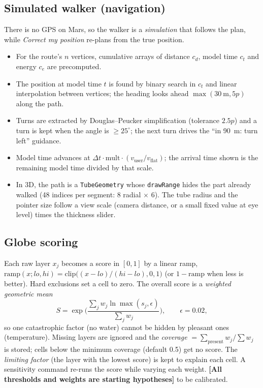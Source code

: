 \documentclass[11pt,a4paper]{article}
\newcommand{\hyp}[1]{\textcolor{marsred}{\textbf{[#1]}}}   %
\renewcommand{\_}{\textunderscore\allowbreak}
\newcommand{\code}[1]{\texttt{#1}}
\begin{document}
\subsection{Simulated walker (navigation)}
There is no GPS on Mars, so the walker is a \emph{simulation} that follows the plan, while \emph{Correct my position} re-plans from the true position.
\begin{itemize}
\item For the route's $n$ vertices, cumulative arrays of distance $c_d$, model time $c_t$ and energy $c_e$ are precomputed.
\item The position at model time $t$ is found by binary search in $c_t$ and linear interpolation between vertices; the heading looks ahead $\max(30\ \text{m},5p)$ along the path.
\item Turns are extracted by Douglas--Peucker simplification (tolerance $2.5p$) and a turn is kept when the angle is $\ge25^\circ$; the next turn drives the ``in 90~m: turn left'' guidance.
\item Model time advances at $\Delta t\cdot\text{mult}\cdot(v_\text{user}/v_\text{flat})$; the arrival time shown is the remaining model time divided by that scale.
\item In 3D, the path is a \code{TubeGeometry} whose \code{drawRange} hides the part already walked (48 indices per segment: 8 radial $\times$ 6). The tube radius and the pointer size follow a view scale (camera distance, or a small fixed value at eye level) times the thickness slider.
\end{itemize}

\subsection{Globe scoring}
Each raw layer $x_j$ becomes a score in $[0,1]$ by a linear ramp, $\text{ramp}(x;lo,hi)=\text{clip}\big((x-lo)/(hi-lo),0,1\big)$ (or $1-\text{ramp}$ when less is better). Hard exclusions set a cell to zero. The overall score is a \emph{weighted geometric mean}
\[
S=\exp\!\Big(\frac{\sum_j w_j\ln\max(s_j,\epsilon)}{\sum_j w_j}\Big),\qquad \epsilon=0.02,
\]
so one catastrophic factor (no water) cannot be hidden by pleasant ones (temperature). Missing layers are ignored and the \emph{coverage} $=\sum_{\text{present}}w_j/\sum w_j$ is stored; cells below the minimum coverage (default 0.5) get no score. The \emph{limiting factor} (the layer with the lowest score) is kept to explain each cell. A sensitivity command re-runs the score while varying each weight. \hyp{All thresholds and weights are starting hypotheses} to be calibrated.
\end{document}
